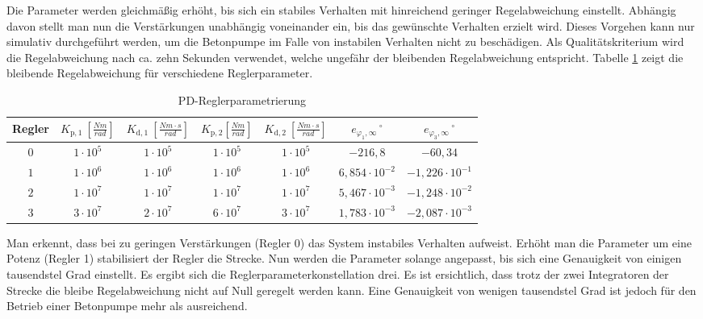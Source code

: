 Die Parameter werden gleichmäßig erhöht, bis sich ein stabiles Verhalten mit hinreichend geringer Regelabweichung einstellt. Abhängig davon stellt man nun die Verstärkungen unabhängig voneinander ein, bis das gewünschte Verhalten erzielt wird. Dieses Vorgehen kann nur simulativ durchgeführt werden, um die Betonpumpe im Falle von instabilen Verhalten nicht zu beschädigen. Als Qualitätskriterium wird die Regelabweichung nach ca. zehn Sekunden verwendet, welche ungefähr der bleibenden Regelabweichung entspricht. Tabelle \ref{tab:Reglerparameter} zeigt die bleibende Regelabweichung für verschiedene Reglerparameter.\newline
	\begin{table}[h!]
	\caption{PD-Reglerparametrierung}
	\label{tab:Reglerparameter}
	\begin{tabular}{|c|c|c|c|c|c|c|}
		\hline \rule[-2ex]{0pt}{5.5ex}  Regler & $K_{\mathrm{p},1}\:\left[ \frac{\si{Nm}}{\si{rad}}\right]$ & $K_{\mathrm{d},1}\:\left[ \frac{\si{Nm}\cdot\si{s}}{\si{rad}}\right]$ & $K_{\mathrm{p},2}\si{ }\left[ \frac{\si{Nm}}{\si{rad}}\right]$ & $K_{\mathrm{d},2}\:\left[ \frac{\si{Nm}\cdot\si{s}}{\si{rad}}\right]$ & $e_{\varphi_1,\infty}\,^\circ$ & $e_{\varphi_3,\infty}\,^\circ$ \\ 
		\hline \rule[-2ex]{0pt}{5.5ex} $0$ & $1\cdot10^5$  & $1\cdot10^5$ & $1\cdot10^5$ & $1\cdot10^5$ & $-216,8$ & $-60,34$ \\
		\hline \rule[-2ex]{0pt}{5.5ex} $1$ & $1\cdot10^6$  & $1\cdot10^6$ & $1\cdot10^6$ & $1\cdot10^6$ & $6,854\cdot10^{-2}$ & $-1,226\cdot10^{-1}$ \\
		\hline \rule[-2ex]{0pt}{5.5ex} $2$ & $1\cdot10^7$  & $1\cdot10^7$ & $1\cdot10^7$ & $1\cdot10^7$ & $5,467\cdot10^{-3}$ & $-1,248\cdot10^{-2}$ \\
		\hline \rule[-2ex]{0pt}{5.5ex} $3$ & $3\cdot10^7$  & $2\cdot10^7$ & $6\cdot10^7$ & $3\cdot10^7$ & $1,783\cdot10^{-3}$ & $-2,087\cdot10^{-3}$ \\
		\hline 
	\end{tabular} 
	\end{table}
Man erkennt, dass bei zu geringen Verstärkungen (Regler 0) das System instabiles Verhalten aufweist. Erhöht man die Parameter um eine Potenz (Regler 1) stabilisiert der Regler die Strecke. Nun werden die Parameter solange angepasst, bis sich eine Genauigkeit von einigen tausendstel Grad einstellt. Es ergibt sich die Reglerparameterkonstellation drei.\newline
Es ist ersichtlich, dass trotz der zwei Integratoren der Strecke die bleibe Regelabweichung nicht auf Null geregelt werden kann. Eine Genauigkeit von wenigen tausendstel Grad ist jedoch für den Betrieb einer Betonpumpe mehr als ausreichend.
